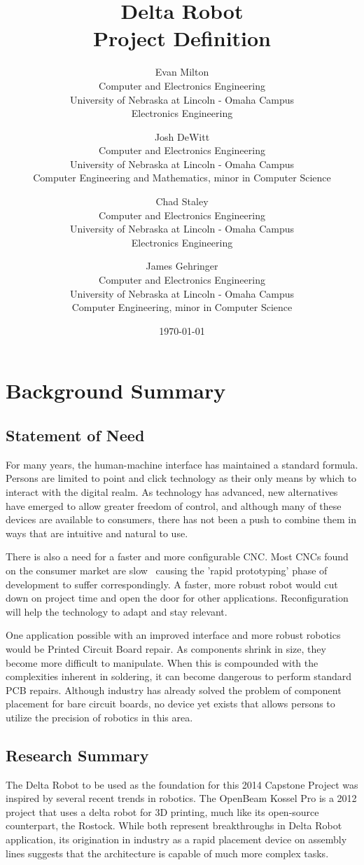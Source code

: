 \documentclass[11pt]{report}
\title{Delta Robot \\ Project Definition}
\author{
	Evan Milton \\
	Computer and Electronics Engineering \\
	University of Nebraska at Lincoln - Omaha Campus \\
	Electronics Engineering
		\and
	Josh DeWitt \\
	Computer and Electronics Engineering \\
	University of Nebraska at Lincoln - Omaha Campus \\
	Computer Engineering and Mathematics, minor in Computer Science
		\and
	Chad Staley \\
	Computer and Electronics Engineering \\
	University of Nebraska at Lincoln - Omaha Campus \\
	Electronics Engineering
		\and
	James Gehringer \\
	Computer and Electronics Engineering \\
	University of Nebraska at Lincoln - Omaha Campus \\
	Computer Engineering, minor in Computer Science
}
\date{\today}
\begin{document}
\maketitle

\tableofcontents

\chapter{Background Summary}
\section{Statement of Need}
For many years, the human-machine interface has maintained a standard formula.
Persons are limited to point and click technology as their only means by which to interact with the digital realm.
As technology has advanced, new alternatives have emerged to allow  greater freedom of control, and although many of these devices are available to consumers, there has not been a push to combine them in ways that are intuitive and natural to use.

There is also a need for a faster and more configurable CNC.
Most CNCs found on the consumer market are slow~ causing the 'rapid prototyping' phase of development to suffer correspondingly.
A faster, more robust robot would cut down on project time and open the door for other applications.
Reconfiguration will help the technology to adapt and stay relevant.

One application possible with an improved interface and more robust robotics would be Printed Circuit Board repair.
As components shrink in size, they become more difficult to manipulate.
When this is compounded with the complexities inherent in soldering, it can become dangerous to perform standard PCB repairs.
Although industry has already solved the problem of component placement for bare circuit boards, no device yet exists that allows persons to utilize the precision of robotics in this area. 

\section{Research Summary}
The Delta Robot to be used as the foundation for this 2014 Capstone Project was inspired by several recent trends in robotics.
The OpenBeam Kossel Pro is a 2012 project that uses a delta robot for 3D printing, much like its open-source counterpart, the Rostock.
While both represent breakthroughs in Delta Robot application, its origination in industry as a rapid placement device on assembly lines suggests that the architecture is capable of much more complex tasks.
\end{document}
